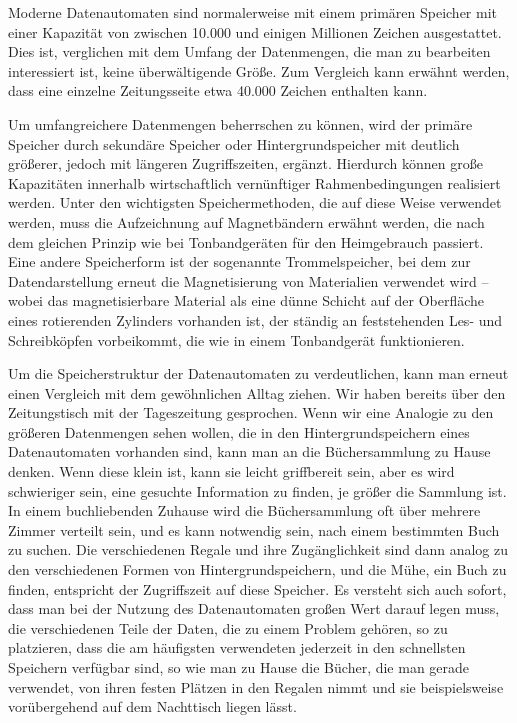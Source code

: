 {Moderne Datenautomaten sind normalerweise mit einem primären Speicher mit einer Kapazität von zwischen 10.000 und einigen Millionen Zeichen ausgestattet. Dies ist, verglichen mit dem Umfang der Datenmengen, die man zu bearbeiten interessiert ist, keine überwältigende Größe. Zum Vergleich kann erwähnt werden, dass eine einzelne Zeitungsseite etwa 40.000 Zeichen enthalten kann.

Um umfangreichere Datenmengen beherrschen zu können, wird der primäre Speicher durch sekundäre Speicher oder Hintergrundspeicher mit deutlich größerer, jedoch mit längeren Zugriffszeiten, ergänzt. Hierdurch können große Kapazitäten innerhalb wirtschaftlich vernünftiger Rahmenbedingungen realisiert werden. Unter den wichtigsten Speichermethoden, die auf diese Weise verwendet werden, muss die Aufzeichnung auf Magnetbändern erwähnt werden, die nach dem gleichen Prinzip wie bei Tonbandgeräten für den Heimgebrauch passiert. Eine andere Speicherform ist der sogenannte Trommelspeicher, bei dem zur Datendarstellung erneut die Magnetisierung von Materialien verwendet wird -- wobei das magnetisierbare Material als eine dünne Schicht auf der Oberfläche eines rotierenden Zylinders vorhanden ist, der ständig an feststehenden Les- und Schreibköpfen vorbeikommt, die wie in einem Tonbandgerät funktionieren.

Um die Speicherstruktur der Datenautomaten zu verdeutlichen, kann man erneut einen Vergleich mit dem gewöhnlichen Alltag ziehen. Wir haben bereits über den Zeitungstisch mit der Tageszeitung gesprochen. Wenn wir eine Analogie zu den größeren Datenmengen sehen wollen, die in den Hintergrundspeichern eines Datenautomaten vorhanden sind, kann man an die Büchersammlung zu Hause denken. Wenn diese klein ist, kann sie leicht griffbereit sein, aber es wird schwieriger sein, eine gesuchte Information zu finden, je größer die Sammlung ist. In einem buchliebenden Zuhause wird die Büchersammlung oft über mehrere Zimmer verteilt sein, und es kann notwendig sein, nach einem bestimmten Buch zu suchen. Die verschiedenen Regale und ihre Zugänglichkeit sind dann analog zu den verschiedenen Formen von Hintergrundspeichern, und die Mühe, ein Buch zu finden, entspricht der Zugriffszeit auf diese Speicher. Es versteht sich auch sofort, dass man bei der Nutzung des Datenautomaten großen Wert darauf legen muss, die verschiedenen Teile der Daten, die zu einem Problem gehören, so zu platzieren, dass die am häufigsten verwendeten jederzeit in den schnellsten Speichern verfügbar sind, so wie man zu Hause die Bücher, die man gerade verwendet, von ihren festen Plätzen in den Regalen nimmt und sie beispielsweise vorübergehend auf dem Nachttisch liegen lässt.
}

